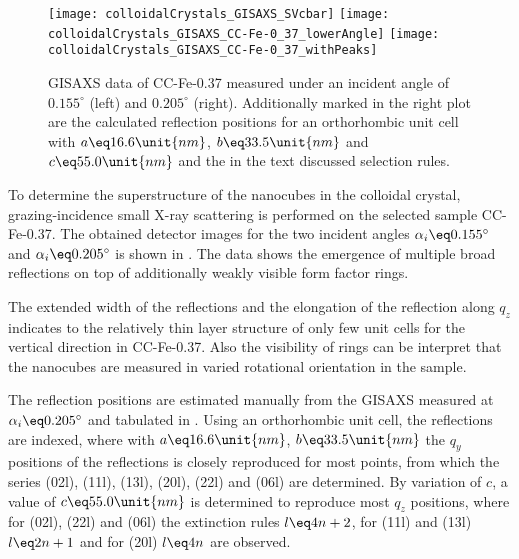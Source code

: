 \documentclass[\main/dresen_thesis.tex]{subfiles}
\begin{document}
  \label{sec:colloidalCrystals:layers:gisaxs}
  \begin{figure}[tb]
    \centering
    \texttt{[image: colloidalCrystals\_GISAXS\_SVcbar]}
    \texttt{[image: colloidalCrystals\_GISAXS\_CC-Fe-0\_37\_lowerAngle]}
    \texttt{[image: colloidalCrystals\_GISAXS\_CC-Fe-0\_37\_withPeaks]}
    \caption{\label{fig:colloidalCrystals:layers:gisaxs}GISAXS data of CC-Fe-0.37 measured under an incident angle of $0.155 ^\circ$ (left) and $0.205 ^\circ$ (right). Additionally marked in the right plot are the calculated reflection positions for an orthorhombic unit cell with $a \eq 16.6 \unit{nm}$, $b \eq 33.5 \unit{nm}$ and $c \eq 55.0 \unit{nm}$ and the in the text discussed selection rules.}
  \end{figure}

  To determine the superstructure of the nanocubes in the colloidal crystal, grazing-incidence small X-ray scattering is performed on the selected sample CC-Fe-0.37.
  The obtained detector images for the two incident angles $\alpha_i \eq 0.155^\circ$ and $\alpha_i \eq 0.205^\circ$ is shown in .
  The data shows the emergence of multiple broad reflections on top of additionally weakly visible form factor rings.

  The extended width of the reflections and the elongation of the reflection along $q_z$ indicates to the relatively thin layer structure of only few unit cells for the vertical direction in CC-Fe-0.37.
  Also the visibility of rings can be interpret that the nanocubes are measured in varied rotational orientation in the sample.

  The reflection positions are estimated manually from the GISAXS measured at $\alpha_i \eq 0.205 ^\circ$ and tabulated in .
  Using an orthorhombic unit cell, the reflections are indexed, where with $a \eq 16.6 \unit{nm}$, $b \eq 33.5 \unit{nm}$ the $q_y$ positions of the reflections is closely reproduced for most points, from which the series (02l), (11l), (13l), (20l), (22l) and (06l) are determined.
  By variation of $c$, a value of $c \eq 55.0 \unit{nm}$ is determined to reproduce most $q_z$ positions, where for (02l), (22l) and (06l) the extinction rules $l \eq 4n + 2$, for (11l) and (13l) $l \eq 2n + 1$ and for (20l) $l \eq 4n$ are observed.
\end{document}
